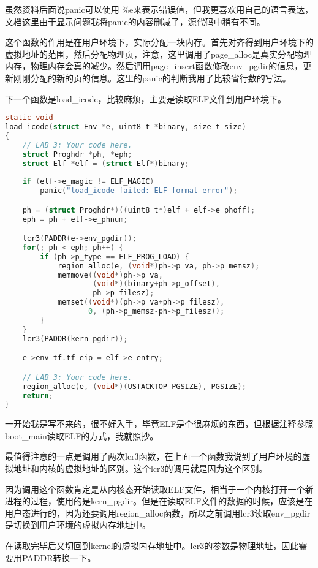 \documentclass[11pt,a4paper]{article}
\begin{document}
虽然资料后面说panic可以使用 \%e来表示错误值，但我更喜欢用自己的语言表达，文档这里由于显示问题我将panic的内容删减了，源代码中稍有不同。

这个函数的作用是在用户环境下，实际分配一块内存。首先对齐得到用户环境下的虚拟地址的范围，然后分配物理页，注意，这里调用了page\_alloc是真实分配物理内存，物理内存会真的减少。然后调用page\_insert函数修改env\_pgdir的信息，更新刚刚分配的新的页的信息。这里的panic的判断我用了比较省行数的写法。

下一个函数是load\_icode，比较麻烦，主要是读取ELF文件到用户环境下。

\setmainfont{Consolas}
\begin{lstlisting}[language={C},firstnumber=1,title=kern/env.c] 
static void
load_icode(struct Env *e, uint8_t *binary, size_t size)
{
	// LAB 3: Your code here.
	struct Proghdr *ph, *eph;
	struct Elf *elf = (struct Elf*)binary;
	
	if (elf->e_magic != ELF_MAGIC)
		panic("load_icode failed: ELF format error");

	ph = (struct Proghdr*)((uint8_t*)elf + elf->e_phoff);
	eph = ph + elf->e_phnum;

	lcr3(PADDR(e->env_pgdir));
	for(; ph < eph; ph++) {
		if (ph->p_type == ELF_PROG_LOAD) {
			region_alloc(e, (void*)ph->p_va, ph->p_memsz);
			memmove((void*)ph->p_va,
			        (void*)(binary+ph->p_offset),
			        ph->p_filesz);
			memset((void*)(ph->p_va+ph->p_filesz), 
			       0, (ph->p_memsz-ph->p_filesz));
		}
	}
	lcr3(PADDR(kern_pgdir));

	e->env_tf.tf_eip = elf->e_entry;

	// LAB 3: Your code here.
	region_alloc(e, (void*)(USTACKTOP-PGSIZE), PGSIZE);
	return;
}
\end{lstlisting}
\setmainfont[BoldFont=黑体]{宋体}

一开始我是写不来的，很不好入手，毕竟ELF是个很麻烦的东西，但根据注释参照boot\_main读取ELF的方式，我就照抄。

最值得注意的一点是调用了两次lcr3函数，在上面一个函数我说到了用户环境的虚拟地址和内核的虚拟地址的区别。这个lcr3的调用就是因为这个区别。

因为调用这个函数肯定是从内核态开始读取ELF文件，相当于一个内核打开一个新进程的过程，使用的是kern\_pgdir。但是在读取ELF文件的数据的时候，应该是在用户态进行的，因为还要调用region\_alloc函数，所以之前调用lcr3读取env\_pgdir是切换到用户环境的虚拟内存地址中。

在读取完毕后又切回到kernel的虚拟内存地址中。lcr3的参数是物理地址，因此需要用PADDR转换一下。
\end{document}
